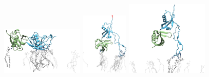 \documentclass[
  twocolumn]{biophys-new-mod}
\begin{document}
\begin{figure}

\begin{minipage}[t]{\linewidth}

{\centering 

\includegraphics[width=0.35\textwidth,height=\textheight]{./assets/vmd/f0f1-pulling/f0f1-pull-start.png}
\includegraphics[width=0.2\textwidth,height=\textheight]{./assets/vmd/f0f1-pulling/f0f1-pull-middle.png}
\includegraphics[width=0.35\textwidth,height=\textheight]{./assets/vmd/f0f1-pulling/f0f1-pull-end.png}

}

\subcaption{\label{fig-f0f1-pull-run-1}~}
\end{minipage}%
\newline
\begin{minipage}[t]{\linewidth}

{\centering 

}
\end{minipage}
\end{figure}
\end{document}
